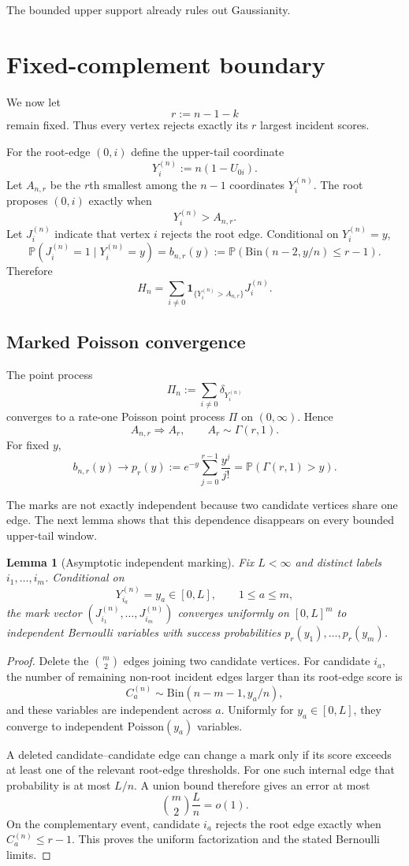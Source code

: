 \documentclass[11pt]{article}
\newtheorem{lemma}[theorem]{Lemma}
\theoremstyle{remark}
\newcommand{\Pp}{\mathbb P}
\newcommand{\1}{\mathbf 1}
\begin{document}
The bounded upper support already rules out Gaussianity.

\section{Fixed-complement boundary}

We now let
\[
r:=n-1-k
\]
remain fixed. Thus every vertex rejects exactly its $r$ largest incident scores.

For the root-edge $(0,i)$ define the upper-tail coordinate
\[
Y_i^{(n)}:=n(1-U_{0i}).
\]
Let $A_{n,r}$ be the $r$th smallest among the $n-1$ coordinates $Y_i^{(n)}$. The root proposes $(0,i)$ exactly when
\[
Y_i^{(n)}>A_{n,r}.
\]
Let $J_i^{(n)}$ indicate that vertex $i$ rejects the root edge. Conditional on $Y_i^{(n)}=y$,
\[
\Pp(J_i^{(n)}=1\mid Y_i^{(n)}=y)
=b_{n,r}(y)
:=
\Pp(\mathrm{Bin}(n-2,y/n)\le r-1).
\tag{4.1}
\]
Therefore
\[
H_n
=
\sum_{i\ne0}
\1_{\{Y_i^{(n)}>A_{n,r}\}}J_i^{(n)}.
\tag{4.2}
\]

\subsection{Marked Poisson convergence}

The point process
\[
\Pi_n:=\sum_{i\ne0}\delta_{Y_i^{(n)}}
\]
converges to a rate-one Poisson point process $\Pi$ on $(0,\infty)$. Hence
\[
A_{n,r}\Longrightarrow A_r,
\qquad
A_r\sim\Gamma(r,1).
\tag{4.3}
\]
For fixed $y$,
\[
b_{n,r}(y)\to p_r(y)
:=
 e^{-y}\sum_{j=0}^{r-1}\frac{y^j}{j!}
=\Pp(\Gamma(r,1)>y).
\tag{4.4}
\]

The marks are not exactly independent because two candidate vertices share one edge. The next lemma shows that this dependence disappears on every bounded upper-tail window.

\begin{lemma}[Asymptotic independent marking]\label{lem:marking}
Fix $L<\infty$ and distinct labels $i_1,\ldots,i_m$. Conditional on
\[
Y_{i_a}^{(n)}=y_a\in[0,L],\qquad 1\le a\le m,
\]
the mark vector $(J_{i_1}^{(n)},\ldots,J_{i_m}^{(n)})$ converges uniformly on $[0,L]^m$ to independent Bernoulli variables with success probabilities $p_r(y_1),\ldots,p_r(y_m)$.
\end{lemma}

\begin{proof}
Delete the $\binom m2$ edges joining two candidate vertices. For candidate $i_a$, the number of remaining non-root incident edges larger than its root-edge score is
\[
C_a^{(n)}\sim\mathrm{Bin}(n-m-1,y_a/n),
\]
and these variables are independent across $a$. Uniformly for $y_a\in[0,L]$, they converge to independent $\mathrm{Poisson}(y_a)$ variables.

A deleted candidate--candidate edge can change a mark only if its score exceeds at least one of the relevant root-edge thresholds. For one such internal edge that probability is at most $L/n$. A union bound therefore gives an error at most
\[
\binom m2\frac Ln=o(1).
\]
On the complementary event, candidate $i_a$ rejects the root edge exactly when $C_a^{(n)}\le r-1$. This proves the uniform factorization and the stated Bernoulli limits.
\end{proof}
\end{document}
